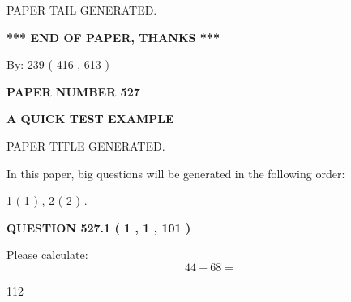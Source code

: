 \documentclass[12pt]{article}
\begin{document}
   
   
   
   
   
 \vspace{0.2in}
 
   
   
\vspace{2.0in} PAPER TAIL GENERATED.
   
   
   
   
\vspace{1.0in} 
{\textbf{\large{ *** END OF PAPER, THANKS *** }}} 
   
   
\hspace{1.0in} By: 
 239 ( 416 ,  613 )
   
   
   
   
\newpage 
\setcounter{page}{ 
   527001 } 
   
   
   
   
 {\textbf{ \Large{ PAPER NUMBER  527  }}}
   
   
\vspace{0.2in}
   
   
   
   
   
   
   
   
 \vspace{0.2in}
{\LARGE {\textbf{ A QUICK TEST EXAMPLE}}}
   
   
 PAPER TITLE GENERATED.
   
   
   
\vspace{0.2in}
   
In this paper, big questions will be generated in the following order: 
   
   
   1 ( 1 )
 ,
   2 ( 2 )
 .
  
\vspace{0.2in}
  
{\textbf{\Large{QUESTION
527.1 
 ( 1 , 1 , 101 )
}}}
  
  
 
Please calculate:
\begin{equation}
44 +  %
68 = \nonumber
\end{equation}
 
 
 
\noindent{}
 
 

112
 
\end{document}
